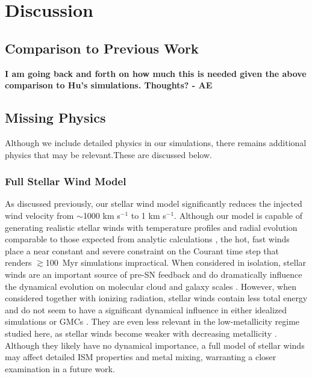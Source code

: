 \documentclass[twocolumn]{aastex61}
\begin{document}
\section{Discussion}
\label{sec:discussion}

\subsection{Comparison to Previous Work}
\textbf{I am going back and forth on how much this is needed given the above comparison to Hu's simulations. Thoughts? - AE}

\subsection{Missing Physics}
Although we include detailed physics in our simulations, there remains additional physics that may be relevant.These are discussed below.

\subsubsection{Full Stellar Wind Model}
\label{sec:stellar winds discussion}
As discussed previously, our stellar wind model significantly reduces the injected wind velocity from $\sim$1000 km s$^{-1}$ to 1 km s$^{-1}$. Although our model is capable of generating realistic stellar winds with temperature profiles and radial evolution comparable to those expected from analytic calculations \citep{Weaver1977}, the hot, fast winds place a near constant and severe constraint on the Courant time step that renders $\gtrsim$100~Myr simulations impractical. When considered in isolation, stellar winds are an important source of pre-SN feedback and do dramatically influence the dynamical evolution on molecular cloud and galaxy scales \citep{Dale2008,Peters2017,Gatto2017}. However, when considered together with ionizing radiation, stellar winds contain less total energy \citep{Agertz2013} and do not seem to have a significant dynamical influence in either idealized simulations \citep{Geen2015} or GMCs \citep{Dale2014}. They are even less relevant in the low-metallicity regime studied here, as stellar winds become weaker with decreasing metallicity \citep{Puls2000, Vink2005}. Although they likely have no dynamical importance, a full model of stellar winds may affect detailed ISM properties and metal mixing, warranting a closer examination in a future work.

\end{document}
